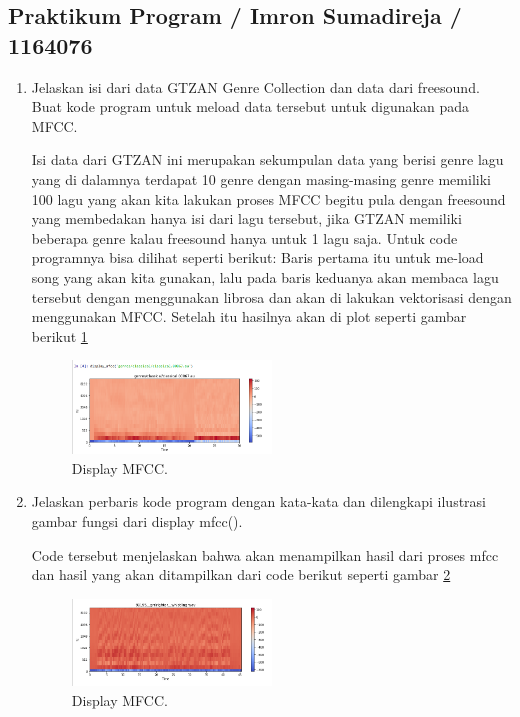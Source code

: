 \subsection{Praktikum Program / Imron Sumadireja / 1164076}
\begin{enumerate}
\item Jelaskan isi dari data GTZAN Genre Collection dan data dari freesound. Buat kode program untuk meload data tersebut untuk digunakan pada MFCC. \par
Isi data dari GTZAN ini merupakan sekumpulan data yang berisi genre lagu yang di dalamnya terdapat 10 genre dengan masing-masing genre memiliki 100 lagu yang akan kita lakukan proses MFCC begitu pula dengan freesound yang membedakan hanya isi dari lagu tersebut, jika GTZAN memiliki beberapa genre kalau freesound hanya untuk 1 lagu saja. Untuk code programnya bisa dilihat seperti berikut:  Baris pertama itu untuk me-load song yang akan kita gunakan, lalu pada baris keduanya akan membaca lagu tersebut dengan menggunakan librosa dan akan di lakukan vektorisasi dengan menggunakan MFCC. Setelah itu hasilnya akan di plot seperti gambar berikut \ref{classic1}
		\begin{figure}[!htbp]
		\centerline{\includegraphics[width=0.5\textwidth]{figures/im/suara1.png}}
		\caption{Display MFCC.}
		\label{classic1}
		\end{figure}

\item Jelaskan perbaris kode program dengan kata-kata dan dilengkapi ilustrasi gambar fungsi dari display mfcc(). \par
 
Code tersebut menjelaskan bahwa akan menampilkan hasil dari proses mfcc dan hasil yang akan ditampilkan dari code berikut seperti gambar \ref{suara2}
		\begin{figure}[!htbp]
		\centerline{\includegraphics[width=0.5\textwidth]{figures/im/suara2.png}}
		\caption{Display MFCC.}
		\label{suara2}
		\end{figure}


\end{enumerate}
